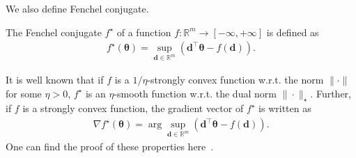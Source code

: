 We also define Fenchel conjugate. 
\begin{def.}
    The Fenchel conjugate $f^\star$ of 
    a function $f : \mathbb{R}^m \to [-\infty, +\infty]$ is defined as
    \begin{align*}
        f^\star(\bm{\theta}) = \sup_{\bm{d} \in \mathbb{R}^m} 
        \left( \bm{d}^\top \bm{\theta} - f(\bm{d}) \right).
    \end{align*}
\end{def.}
It is well known that if $f$ is a $1/\eta$-strongly convex function 
w.r.t. the norm $\|\cdot\|$ for some $\eta > 0$, 
$f^\star$ is an $\eta$-smooth function
w.r.t. the dual norm $\|\cdot\|_\star$. 
Further, if $f$ is a strongly convex function, 
the gradient vector of $f^\star$ is written as
\begin{align}
    \nonumber
    \nabla f^\star(\bm{\theta}) = 
    \arg \sup_{\bm{d} \in \mathbb{R}^m}
    \left( \bm{d}^\top \bm{\theta} - f(\bm{d}) \right).
\end{align}
One can find the proof of these properties 
here~\citep{borwein+:springer06,shalev-shwartz+:jml10}.

